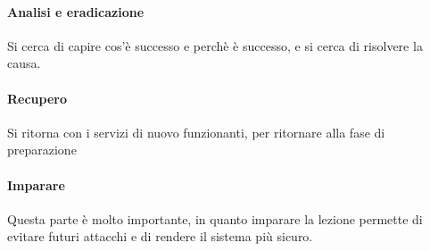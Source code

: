 \paragraph*{Analisi e eradicazione} Si cerca di capire cos'è successo e perchè è
successo, e si cerca di risolvere la causa.

\paragraph*{Recupero} Si ritorna con i servizi di nuovo funzionanti, per
ritornare alla fase di preparazione

\paragraph*{Imparare} Questa parte è molto importante, in quanto imparare la
lezione permette di evitare futuri attacchi e di rendere il sistema più sicuro.
